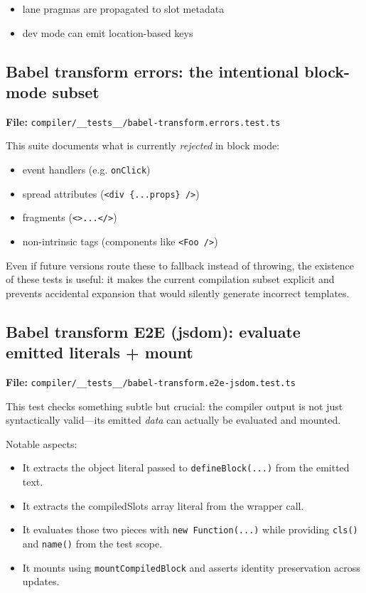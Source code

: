 \begin{itemize}
\item lane pragmas are propagated to slot metadata
\item dev mode can emit location-based keys
\end{itemize}

\subsection{Babel transform errors: the intentional block-mode subset}


	\textbf{File:} \texttt{compiler/\_\_tests\_\_/babel-transform.errors.test.ts}

This suite documents what is currently \emph{rejected} in block mode:

\begin{itemize}
\item event handlers (e.g. \texttt{onClick})
\item spread attributes (\texttt{<div \{...props\} />})
\item fragments (\texttt{<>...</>})
\item non-intrinsic tags (components like \texttt{<Foo />})
\end{itemize}

Even if future versions route these to fallback instead of throwing, the existence of these tests is useful: it makes the current compilation subset explicit and prevents accidental expansion that would silently generate incorrect templates.

\subsection{Babel transform E2E (jsdom): evaluate emitted literals + mount}


	\textbf{File:} \texttt{compiler/\_\_tests\_\_/babel-transform.e2e-jsdom.test.ts}

This test checks something subtle but crucial: the compiler output is not just syntactically valid---its emitted \emph{data} can actually be evaluated and mounted.

Notable aspects:

\begin{itemize}
\item It extracts the object literal passed to \texttt{defineBlock(...)} from the emitted text.
\item It extracts the compiledSlots array literal from the wrapper call.
\item It evaluates those two pieces with \texttt{new Function(...)} while providing \texttt{cls()} and \texttt{name()} from the test scope.
\item It mounts using \texttt{mountCompiledBlock} and asserts identity preservation across updates.
\end{itemize}

